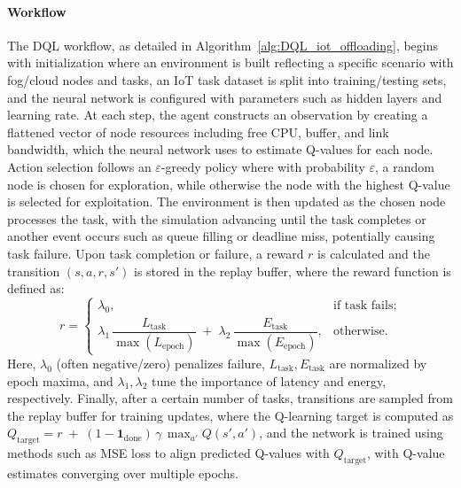 \documentclass[preprint,3p,authoryear]{elsarticle}
\begin{document}
\paragraph{Workflow}
The DQL workflow, as detailed in Algorithm~\ref{alg:DQL_iot_offloading}, begins with initialization where an environment is built reflecting a specific scenario with fog/cloud nodes and tasks, an IoT task dataset is split into training/testing sets, and the neural network is configured with parameters such as hidden layers and learning rate. At each step, the agent constructs an observation by creating a flattened vector of node resources including free CPU, buffer, and link bandwidth, which the neural network uses to estimate Q-values for each node. Action selection follows an \(\varepsilon\)-greedy policy where with probability \(\varepsilon\), a random node is chosen for exploration, while otherwise the node with the highest Q-value is selected for exploitation. The environment is then updated as the chosen node processes the task, with the simulation advancing until the task completes or another event occurs such as queue filling or deadline miss, potentially causing task failure. Upon task completion or failure, a reward \(r\) is calculated and the transition \((s,a,r,s')\) is stored in the replay buffer, where the reward function is defined as:
\[
\textit{r} = 
\begin{cases}
\lambda_0, & \text{if task fails};\\[4pt]
\lambda_1 \,\dfrac{L_{\text{task}}}{\max(L_{\text{epoch}})} 
\;+\;
\lambda_2 \,\dfrac{E_{\text{task}}}{\max(E_{\text{epoch}})},
& \text{otherwise}.
\end{cases}
\]
Here, \(\lambda_0\) (often negative/zero) penalizes failure, \(L_{\text{task}}, E_{\text{task}}\) are normalized by epoch maxima, and \(\lambda_1, \lambda_2\) tune the importance of latency and energy, respectively. Finally, after a certain number of tasks, transitions are sampled from the replay buffer for training updates, where the Q-learning target is computed as \(Q_{\text{target}} = r \;+\; (1 - \mathbf{1}_{\text{done}})\,\gamma\, \max_{a'} Q(s',a')\), and the network is trained using methods such as MSE loss to align predicted Q-values with \(Q_{\text{target}}\), with Q-value estimates converging over multiple epochs.
\end{document}
